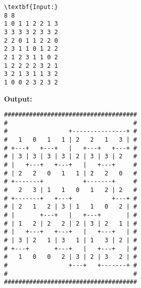\begin{verbatim}
\textbf{Input:}
8 8
1 0 1 1 2 2 1 3
3 3 3 3 2 3 3 2
2 2 0 1 1 2 2 0
2 3 1 1 0 1 2 2
2 1 2 3 1 1 0 2
1 2 2 2 2 3 2 1
3 2 1 3 1 1 3 2
1 0 0 2 3 2 3 2\end{verbatim}

\textbf{Output:}
\begin{verbatim}
#####################################
#                                   #
#                 +---------------+ #
#   1   0   1   1 | 2   2   1   3 | #
# +---+   +---+   |   +---+   +---+ #
# | 3 | 3 | 3 | 3 | 2 | 3 | 3 | 2   #
# |   +---+   +---+   |   +---+     #
# | 2   2   0   1   1 | 2   2   0   #
# +-------+           +-------+     #
#   2   3 | 1   1   0   1   2 | 2   #
# +-------+   +---+           +---+ #
# | 2   1   2 | 3 | 1   1   0   2 | #
# |       +---+   |   +---+       | #
# | 1   2 | 2   2 | 2 | 3 | 2   1 | #
# |   +---+   +---+   |   +---+   | #
# | 3 | 2   1 | 3   1 | 1   3 | 2 | #
# +---+       +---+   |   +---+   | #
#   1   0   0   2 | 3 | 2 | 3   2 | #
#                 +---+   +-------+ #
#                                   #
#####################################
\end{verbatim}